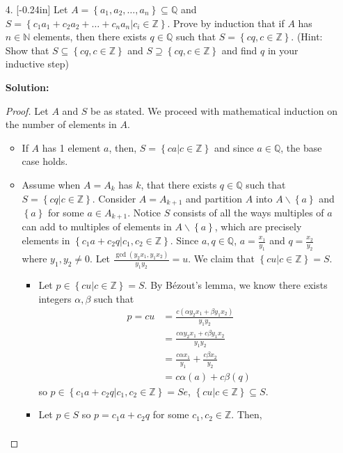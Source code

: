 \documentclass[letterpaper,12pt]{article}
\newcommand{\set}[1]{\left\{ #1 \right\}}
\theoremstyle{definition}
\begin{document}
\pagebreak
\begin{enumerate}
    \item[4.]\reversemarginpar{}[-0.24in] 
  Let $A = \set{a_1,a_2,\ldots,a_n} \subseteq \mathbb{Q}$ and $S = \set{c_1a_1 + c_2a_2 + \ldots + c_n a_n |  c_i  \in \mathbb{Z}}$. Prove by induction that if $A$ has $n \in \mathbb{N}$ elements, then there exists $q \in \mathbb{Q}$ such that $S = \set{cq, c \in \mathbb{Z}}$. (Hint: Show that $S \subseteq \set{cq, c \in \mathbb{Z}}$ and $S \supseteq \set{cq, c \in \mathbb{Z}}$ and find $q$ in your inductive step)
  \begin{mdframed}
  \textbf{Solution:}
      \begin{proof}
          Let $A$ and $S$ be as stated. We proceed with mathematical induction on the number of elements in $A$. \begin{itemize}
        \item If $A$ has 1 element $a$, then, $S = \set{ca| c \in \mathbb{Z}}$ and since $a \in \mathbb{Q}$, the base case holds.
        \item Assume when $A=A_{k}$ has $k$, that there exists $q \in \mathbb{Q}$ such that $S = \set{cq| c \in \mathbb{Z}}$. Consider $A=A_{k+1}$ and partition $A$ into $A\backslash \set{a}$ and $\set{a}$ for some $a \in A_{k+1}$. Notice $S$ consists of all the ways multiples of $a$ can add to multiples of elements in $ A\backslash \set{a}$, which are precisely elements in $\set{c_1 a + c_2 q| c_1,c_2 \in \mathbb{Z}}$. Since $a,q \in \mathbb{Q}$, $a = \frac{x_1}{y_1}$ and $q = \frac{x_2}{y_2}$ where $y_1,y_2 \neq 0$. Let $\frac{\gcd (y_2x_1,y_1x_2)}{y_1y_2} = u$. We claim that $\set{ cu| c \in \mathbb{Z} } = S$. \begin{itemize}
            \item Let $p \in \set{ cu| c \in \mathbb{Z} } = S$. By Bézout's lemma, we know there exists integers $\alpha,\beta$ such that \begin{align*}
                p = cu &= \frac{c( \alpha y_2x_1 + \beta y_1x_2)}{y_1y_2} \\
                &= \frac{c\alpha y_2x_1 + c\beta y_1x_2}{y_1y_2} \\
                &= \frac{c\alpha x_1}{y_1} + \frac{c\beta x_2}{y_2} \\
                &= c\alpha(a) + c\beta(q)
            \end{align*}
            so $p \in \set{c_1 a + c_2 q| c_1,c_2 \in \mathbb{Z}} = Se$, $\set{ cu| c \in \mathbb{Z} } \subseteq S$.
            \item Let $p \in S$ so $p = c_1a + c_2 q$ for some $c_1, c_2 \in \mathbb{Z}$. Then, \begin{align*}

\end{align*}
\end{itemize}
\end{itemize}
\end{proof}
\end{mdframed}
\end{enumerate}
\end{document}
